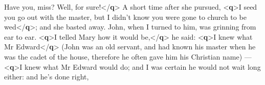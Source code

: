 \documentclass[11pt,twoside]{article}\makeatletter
\begin{document}
\begin{shaded}
\mbox{}\newline 
\hspace*{1em}Have you, miss? Well, for sure!{</\textbf{q}>}\mbox{}\newline 
{}\mbox{}\newline 
{}A short time after she pursued, {<\textbf{q}>}I seed you go out with\mbox{}\newline 
\hspace*{1em}\hspace*{1em}\hspace*{1em}\hspace*{1em} the master, but I didn't know you were gone to church to be\mbox{}\newline 
\hspace*{1em}\hspace*{1em}\hspace*{1em}\hspace*{1em} wed{</\textbf{q}>}; and she basted away. John, when I turned to him,\mbox{}\newline 
\hspace*{1em}\hspace*{1em} was grinning from ear to ear. {<\textbf{q}>}I telled Mary how it would\mbox{}\newline 
\hspace*{1em}\hspace*{1em}\hspace*{1em}\hspace*{1em} be,{</\textbf{q}>} he said: {<\textbf{q}>}I knew what Mr Edward{</\textbf{q}>} (John was an\mbox{}\newline 
\hspace*{1em}\hspace*{1em} old servant, and had known his master when he was the cadet\mbox{}\newline 
\hspace*{1em}\hspace*{1em} of the house, therefore he often gave him his Christian\mbox{}\newline 
\hspace*{1em}\hspace*{1em} name) — {<\textbf{q}>}I knew what Mr Edward would do; and I was\mbox{}\newline 
\hspace*{1em}\hspace*{1em}\hspace*{1em}\hspace*{1em} certain he would not wait long either: and he's done right,\mbox{}\newline 

\end{shaded}
\end{document}
